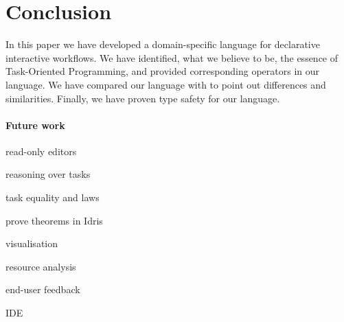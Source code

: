 
\section{Conclusion}

In this paper we have developed a domain-specific language for declarative interactive workflows.
We have identified, what we believe to be, the essence of Task-Oriented Programming, and provided corresponding operators in our language.
We have compared our language with \CSP to point out differences and similarities.
Finally, we have proven type safety for our language.

\paragraph{Future work}

\begin{itemize*}
  \item read-only editors
  \item reasoning over tasks
  \item task equality and laws
  \item prove theorems in Idris
  \item visualisation
  \item resource analysis
  \item end-user feedback
  \item IDE
\end{itemize*}
